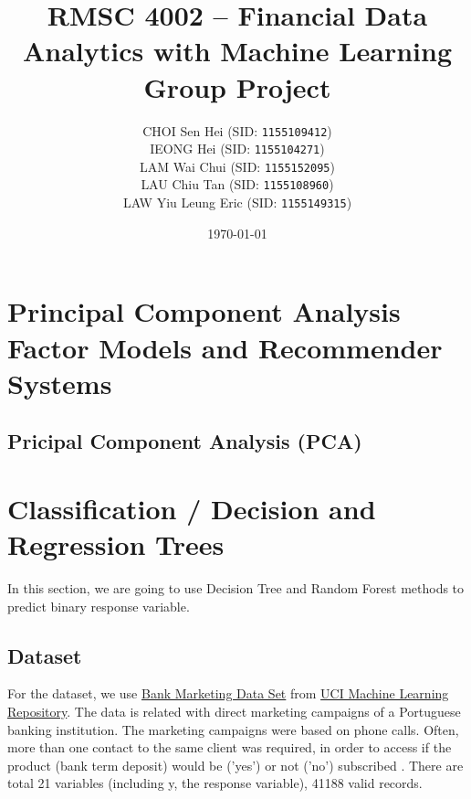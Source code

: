 \documentclass[11pt,a4paper]{article}
\begin{document}
    \thispagestyle{empty}
    \title{\textsc{RMSC 4002} -- Financial Data Analytics with Machine Learning \\ Group Project}
    \author{
        CHOI Sen Hei (SID: \texttt{1155109412}) \\
        IEONG Hei (SID: \texttt{1155104271}) \\
        LAM Wai Chui (SID: \texttt{1155152095}) \\
        LAU Chiu Tan (SID: \texttt{1155108960}) \\
        LAW Yiu Leung Eric (SID: \texttt{1155149315})
    }
    \date{\today}
    \maketitle
    
    \tableofcontents
    \newpage
    
    
    \setcounter{page}{1}
    
    \section{Principal Component Analysis Factor Models and Recommender Systems}
    \subsection{Pricipal Component Analysis (PCA)}
    
    
    \newpage
    \section{Classification / Decision and Regression Trees}
    In this section, we are going to use Decision Tree and Random Forest methods to predict binary response variable.
    
    \subsection{Dataset}
    For the dataset, we use \href{https://archive.ics.uci.edu/ml/datasets/bank+marketing}{Bank Marketing Data Set} from  \href{https://archive.ics.uci.edu/ml/index.php}{UCI Machine Learning Repository}.
    The data is related with direct marketing campaigns of a Portuguese banking institution. The marketing campaigns were based on phone calls. Often, more than one contact to the same client was required, in order to access if the product (bank term deposit) would be ('yes') or not ('no') subscribed \cite{MORO201422}. There are total 21 variables (including y, the response variable), 41188 valid records. \\
    
\end{document}
